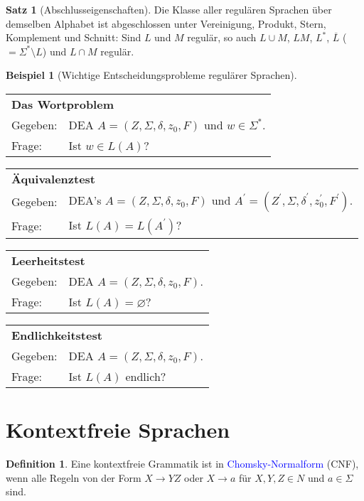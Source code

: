 \documentclass{scrreprt}
\theoremstyle{definition}
\newtheorem{Definition}{Definition}[section]
\newtheorem{Satz}{Satz}[section]
\theoremstyle{example}
\newtheorem{Beispiel}{Beispiel}[section]
\theoremstyle{algorithm}
\begin{document}
\begin{Satz}[Abschlusseigenschaften]
Die Klasse aller regulären Sprachen über demselben Alphabet ist abgeschlossen unter Vereinigung, Produkt, Stern, Komplement und Schnitt: Sind $L$ und $M$ regulär, so auch $L \cup M$, $LM$, $L^*$, $\overline{L}$ ($= \Sigma^* \setminus L$) und $L \cap M$ regulär.
\end{Satz}

\begin{Beispiel}[Wichtige Entscheidungsprobleme regulärer Sprachen]
\begin{tabular}{ll}
\multicolumn{2}{l}{\textbf{Das Wortproblem}}\\
Gegeben:&DEA $A=(Z,\Sigma,\delta,z_0,F)$ und $w\in\Sigma^*$.\\
Frage:&Ist $w\in L(A)$?\\
\end{tabular}\newline
\begin{tabular}{ll}
\multicolumn{2}{l}{\textbf{Äquivalenztest}}\\
Gegeben:&DEA's $A=(Z,\Sigma,\delta,z_0,F)$ und $A^\prime=(Z^\prime,\Sigma,\delta^\prime,z_0^\prime,F^\prime)$.\\
Frage:&Ist $L(A) = L(A^\prime)$?\\
\end{tabular}\newline
\begin{tabular}{ll}
\multicolumn{2}{l}{\textbf{Leerheitstest}}\\
Gegeben:&DEA $A=(Z,\Sigma,\delta,z_0,F)$.\\
Frage:&Ist $L(A) = \varnothing$?\\
\end{tabular}\newline
\begin{tabular}{ll}
\multicolumn{2}{l}{\textbf{Endlichkeitstest}}\\
Gegeben:&DEA $A=(Z,\Sigma,\delta,z_0,F)$.\\
Frage:&Ist $L(A)$ endlich?\\
\end{tabular}
\end{Beispiel}

\section{Kontextfreie Sprachen}
\begin{Definition}
Eine kontextfreie Grammatik ist in \textcolor{blue}{Chomsky-Normalform} (CNF), wenn alle Regeln von der Form $X\rightarrow YZ$ oder $X \rightarrow a$ für $X, Y, Z \in N$ und $a\in \Sigma$ sind.
\end{Definition}
\end{document}
